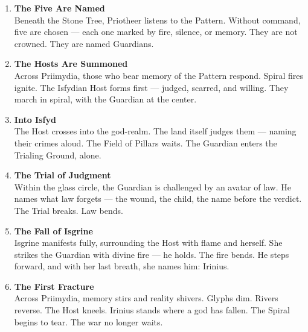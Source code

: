 \documentclass[9pt]{article}
\begin{document}
\begin{center}
\begin{enumerate}
    \item \textbf{The Five Are Named} \\
    Beneath the Stone Tree, Priotheer listens to the Pattern. Without command, five are chosen — each one marked by fire, silence, or memory. They are not crowned. They are named Guardians.

    \vspace{.3in}
    \item \textbf{The Hosts Are Summoned} \\
    Across Priimydia, those who bear memory of the Pattern respond. Spiral fires ignite. The Isfydian Host forms first — judged, scarred, and willing. They march in spiral, with the Guardian at the center.

    \vspace{.3in}
    \item \textbf{Into Isfyd} \\
    The Host crosses into the god-realm. The land itself judges them — naming their crimes aloud. The Field of Pillars waits. The Guardian enters the Trialing Ground, alone.

    \vspace{.3in}
    \item \textbf{The Trial of Judgment} \\
    Within the glass circle, the Guardian is challenged by an avatar of law. He names what law forgets — the wound, the child, the name before the verdict. The Trial breaks. Law bends.

    \vspace{.3in}
    \item \textbf{The Fall of Isgrine} \\
    Isgrine manifests fully, surrounding the Host with flame and herself. She strikes the Guardian with divine fire — he holds. The fire bends. He steps forward, and with her last breath, she names him: Irinius.

    \vspace{.3in}
    \item \textbf{The First Fracture} \\
    Across Priimydia, memory stirs and reality shivers. Glyphs dim. Rivers reverse. The Host kneels. Irinius stands where a god has fallen. The Spiral begins to tear. The war no longer waits.
\end{enumerate}
\end{center}
\end{document}
